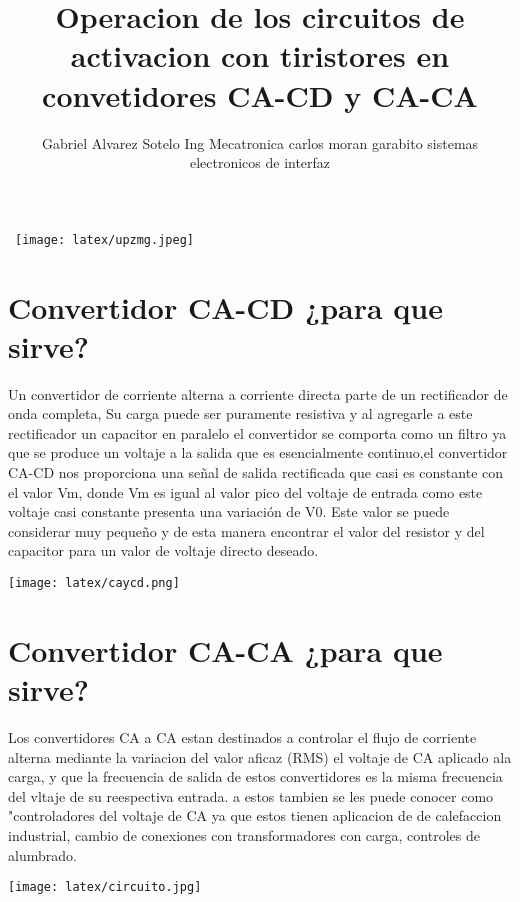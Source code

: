 \documentclass[10pt,a4paper]{article}
\author{Gabriel Alvarez Sotelo
Ing Mecatronica
carlos moran garabito
sistemas electronicos de interfaz}
\title{Operacion de los circuitos de activacion con tiristores en convetidores CA-CD y CA-CA}
\begin{document}
\maketitle\
\texttt{[image: latex/upzmg.jpeg]} 
\newpage
\maketitle\section{Convertidor CA-CD ¿para que sirve?}
Un  convertidor  de  corriente  alterna  a  corriente  directa  parte  de  un  rectificador  de  onda  completa,  Su  carga  puede  ser  puramente  resistiva y al  agregarle  a  este  rectificador  un  capacitor en paralelo el convertidor se comporta como un filtro ya que se produce un voltaje a la salida que es esencialmente continuo,el  convertidor  CA-CD  nos  proporciona  una  señal  de  salida  rectificada que casi es constante con el valor  Vm,  donde  Vm  es  igual  al  valor  pico  del  voltaje  de  entrada como este  voltaje  casi  constante  presenta  una  variación  de  V0.  Este  valor  se  puede  considerar  muy  pequeño  y  de  esta  manera  encontrar  el  valor  del  resistor  y  del capacitor para un valor de voltaje directo deseado. 



\texttt{[image: latex/caycd.png]} 
\maketitle\section{Convertidor CA-CA ¿para que sirve?}
Los convertidores CA a CA estan destinados a controlar el flujo de corriente alterna mediante la variacion del valor aficaz (RMS) el voltaje de CA aplicado ala carga, y que la frecuencia de salida de estos convertidores es la misma frecuencia del vltaje de su reespectiva entrada.
a estos tambien se les puede conocer como "controladores del voltaje de CA ya que estos tienen aplicacion de de calefaccion industrial, cambio de conexiones con transformadores con carga, controles de alumbrado.

\texttt{[image: latex/circuito.jpg]} 
\newpage
\end{document}
